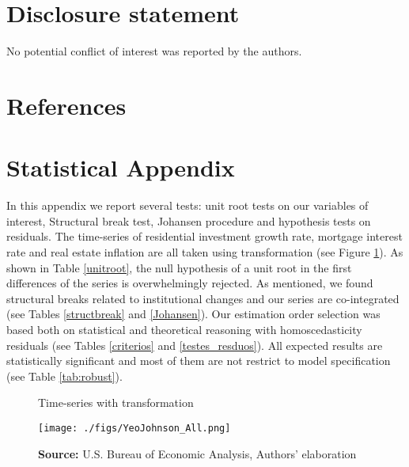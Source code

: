 \documentclass[12pt, a4paper]{article}
\begin{document}
\section*{Disclosure statement}
\label{sec:org49bd39a}
No potential conflict of interest was reported by the authors.

\section*{References}
\label{sec:org6fd9f03}
\printbibliography[heading=none]


\appendix
\section{Statistical Appendix}
\label{sec:orgd228aa7}
\label{appen:A}

In this appendix we report several tests: unit root tests on our variables of interest, Structural break test, Johansen procedure and hypothesis tests on residuals. 
The time-series of residential investment growth rate, mortgage interest rate and real estate inflation are all taken using \textcite{yeo_new_2000} transformation (see Figure \ref{YeoJhonson}).
As shown in Table \ref{unitroot}, the null hypothesis of a unit root in the first differences of the series is overwhelmingly rejected.
As mentioned, we found structural breaks related to institutional changes and our series are co-integrated (see Tables \ref{structbreak} and \ref{Johansen}).
Our estimation order selection was based both on statistical and theoretical reasoning with homoscedasticity residuals (see Tables \ref{criterios} and \ref{testes_resduos}).
All expected results are statistically significant and most of them are not restrict to model specification (see Table \ref{tab:robust}).

\begin{figure}[htb]
	\centering
	\caption{Time-series with \textcite{yeo_new_2000} transformation}
	\label{YeoJhonson}
	\texttt{[image: ./figs/YeoJohnson\_All.png]}
	\caption*{\textbf{Source:} U.S. Bureau of Economic Analysis, Authors' elaboration}
\end{figure}






\end{document}

